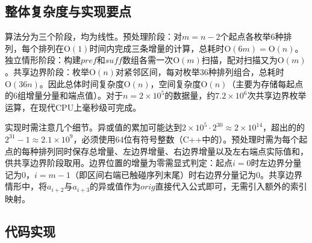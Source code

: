 \subsection{整体复杂度与实现要点}

算法分为三个阶段，均为线性。预处理阶段：对$m=n-2$个起点各枚举$6$种排列，每个排列在$\mathrm{O}(1)$时间内完成三条增量的计算，总耗时$\mathrm{O}(6m)=\mathrm{O}(n)$。独立情形阶段：构建$\mathit{pref}$和$\mathit{suff}$数组各需一次$\mathrm{O}(m)$扫描，配对扫描又为$\mathrm{O}(m)$。共享边界阶段：枚举$\mathrm{O}(n)$对紧邻区间，每对枚举$36$种排列组合，总耗时$\mathrm{O}(36n)$。因此总体时间复杂度$\mathrm{O}(n)$，空间复杂度$\mathrm{O}(n)$（主要为存储每起点的$6$组增量分量和端点值）。对于$n=2\times10^5$的数据量，约$7.2\times10^6$次共享边界枚举运算，在现代CPU上毫秒级可完成。

实现时需注意几个细节。异或值的累加可能达到$2\times10^5\cdot 2^{30}\approx 2\times10^{14}$，超出的的$2^{31}-1\approx2.1\times10^9$，必须使用64位有符号整数（C++中的）。预处理时需为每个起点的每种排列同时保存总增量、左边界增量、右边界增量以及左右端点实际值和，供共享边界阶段取用。边界位置的增量为零需显式判定：起点$i=0$时左边界分量记为$0$，$i=m-1$（即区间右端已触碰序列末尾）时右边界分量记为$0$。共享边界情形中，将$a_{i+2}$与$a_{i+3}$的异或值作为$\mathit{orig}$直接代入公式即可，无需引入额外的索引映射。

\subsection{代码实现}
\inputminted{c++}{../src/p05_ecology_corridor.cpp}

